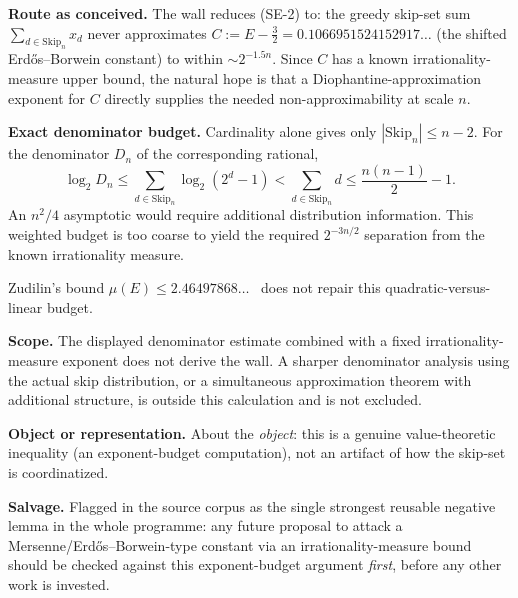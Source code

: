 \begin{obs}
\label{obs:irrationality-measure}
\textbf{Route as conceived.} The wall reduces (SE-2) to: the greedy skip-set sum
$\sum_{d\in\mathrm{Skip}_n}x_d$ never approximates $C:=E-\tfrac32=0.1066951524152917\ldots$ (the shifted
Erdős–Borwein constant) to within $\sim 2^{-1.5n}$. Since $C$ has a known irrationality-measure
upper bound, the natural hope is that a Diophantine-approximation exponent for $C$ directly
supplies the needed non-approximability at scale $n$.

\textbf{Exact denominator budget.} Cardinality alone gives only
$|\mathrm{Skip}_n|\le n-2$. For the denominator $D_n$ of the corresponding rational,
\[
 \log_2 D_n\le\sum_{d\in\mathrm{Skip}_n}\log_2(2^d-1)
 <\sum_{d\in\mathrm{Skip}_n}d\le \frac{n(n-1)}2-1.
\]
An $n^2/4$ asymptotic would require additional distribution information. This weighted budget
is too coarse to yield the required $2^{-3n/2}$ separation from the known irrationality measure.

Zudilin's bound $\mu(E)\le 2.46497868\ldots$~\cite[Theorem~1, p.~154]{zudilin2004} does not
repair this quadratic-versus-linear budget.

\textbf{Scope.} The displayed denominator estimate combined with a fixed irrationality-measure
exponent does not derive the wall. A sharper denominator analysis using the actual skip
distribution, or a simultaneous approximation theorem with additional structure, is outside this
calculation and is not excluded.

\textbf{Object or representation.} About the \emph{object}: this is a genuine value-theoretic
inequality (an exponent-budget computation), not an artifact of how the skip-set is coordinatized.

\textbf{Salvage.} Flagged in the source corpus as the single strongest reusable negative lemma in
the whole programme: any future proposal to attack a Mersenne/Erdős–Borwein-type constant via an
irrationality-measure bound should be checked against this exponent-budget argument \emph{first},
before any other work is invested.
\end{obs}

